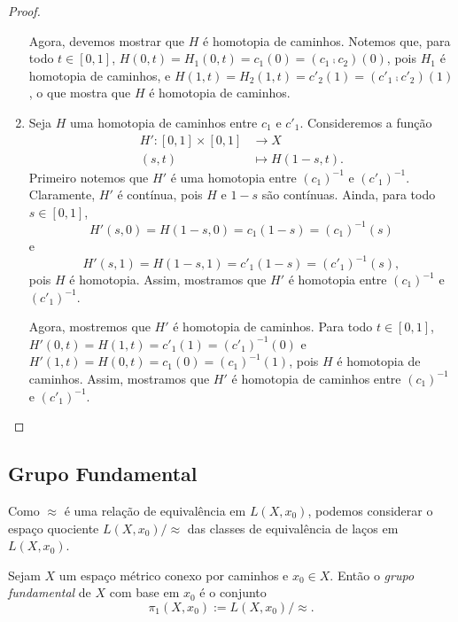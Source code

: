 \begin{proof}
\begin{enumerate}
	Agora, devemos mostrar que $H$ é homotopia de caminhos. Notemos que, para todo $t \in [0,1]$, $H(0,t) = H_1(0,t) = c_1(0) = (c_1 \comp c_2)(0)$, pois $H_1$ é homotopia de caminhos, e $H(1,t) = H_2(1,t) = c'_2(1) = (c'_1 \comp c'_2)(1)$, o que mostra que $H$ é homotopia de caminhos.
	
	\item Seja $H$ uma homotopia de caminhos entre $c_1$ e $c'_1$. Consideremos a função
	\begin{align*}
	H': [0,1] \times [0,1] &\to X \\
		(s,t) &\mapsto H(1-s,t).
	\end{align*}
	Primeiro notemos que $H'$ é uma homotopia entre  $(c_1)^{-1}$ e $(c'_1)^{-1}$. Claramente, $H'$ é contínua, pois $H$ e $1-s$ são contínuas. Ainda, para todo $s \in [0,1]$,
	\begin{equation*}
	H'(s,0)=H(1-s,0)=c_1(1-s)=(c_1)^{-1}(s)
	\end{equation*}
e
	\begin{equation*}
	H'(s,1)=H(1-s,1)=c'_1(1-s)=(c'_1)^{-1}(s),
	\end{equation*}
pois $H$ é homotopia. Assim, mostramos que $H'$ é homotopia entre $(c_1)^{-1}$ e $(c'_1)^{-1}$.
	
	Agora, mostremos que $H'$ é homotopia de caminhos. Para todo $t \in [0,1]$, $H'(0,t)=H(1,t)=c'_1(1)=(c'_1)^{-1}(0)$ e $H'(1,t)=H(0,t)=c_1(0)=(c_1)^{-1}(1)$, pois $H$ é homotopia de caminhos. Assim, mostramos que $H'$ é homotopia de caminhos entre $(c_1)^{-1}$ e $(c'_1)^{-1}$.
	\end{enumerate}
\end{proof}









\subsection{Grupo Fundamental}

Como $\approx$ é uma relação de equivalência em $L(X,x_0)$, podemos considerar o espaço quociente $L(X,x_0) / \approx$ das classes de equivalência de laços em $L(X,x_0)$.

\begin{defi}
	Sejam $X$ um espaço métrico conexo por caminhos e $x_0 \in X$. Então o \emph{grupo fundamental} de $X$ com base em $x_0$ é o conjunto
	\begin{equation*}
	\pi_1(X,x_0) := L(X,x_0) / \approx.
	\end{equation*}
\end{defi}

